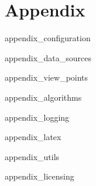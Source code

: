\chapter{Appendix}
\label{sec:appendix}

 {appendix_configuration}

 {appendix_data_sources}

 {appendix_view_points}

 {appendix_algorithms}

 {appendix_logging}

 {appendix_latex}

 {appendix_utils}

 {appendix_licensing} 

